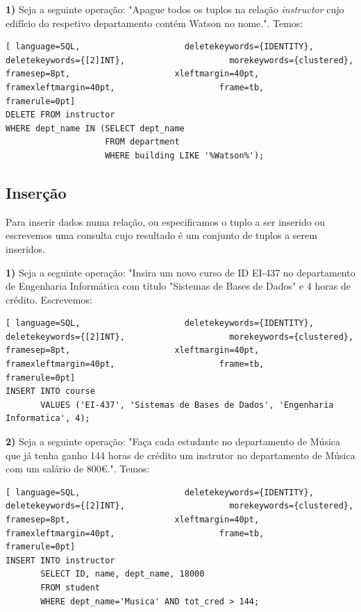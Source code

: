 \documentclass[titlepage]{book}
\theoremstyle{definition}
\begin{document}
\textbf{1)} Seja a seguinte operação: "Apague todos os tuplos na relação \textit{instructor} cujo edifício do respetivo departamento contém Watson no nome.". Temos:
\begin{lstlisting}[ language=SQL,                     deletekeywords={IDENTITY},                     deletekeywords={[2]INT},                     morekeywords={clustered},                     framesep=8pt,                     xleftmargin=40pt,                     framexleftmargin=40pt,                     frame=tb,                     framerule=0pt]
DELETE FROM instructor
WHERE dept_name IN (SELECT dept_name
                    FROM department
                    WHERE building LIKE '%Watson%');
\end{lstlisting}

\subsection{Inserção}
Para inserir dados numa relação, ou especificamos o tuplo a ser inserido ou escrevemos uma consulta cujo resultado é um conjunto de tuplos a serem inseridos.

\textbf{1)} Seja a seguinte operação: "Insira um novo curso de ID EI-437 no departamento de Engenharia Informática com título "Sistemas de Bases de Dados" e 4 horas de crédito. Escrevemos:
\begin{lstlisting}[ language=SQL,                     deletekeywords={IDENTITY},                     deletekeywords={[2]INT},                     morekeywords={clustered},                     framesep=8pt,                     xleftmargin=40pt,                     framexleftmargin=40pt,                     frame=tb,                     framerule=0pt]
INSERT INTO course
       VALUES ('EI-437', 'Sistemas de Bases de Dados', 'Engenharia Informatica', 4);
\end{lstlisting}

\textbf{2)} Seja a seguinte operação: "Faça cada estudante no departamento de Música que já tenha ganho 144 horas de crédito um instrutor no departamento de Música com um salário de 800€.". Temos:
\begin{lstlisting}[ language=SQL,                     deletekeywords={IDENTITY},                     deletekeywords={[2]INT},                     morekeywords={clustered},                     framesep=8pt,                     xleftmargin=40pt,                     framexleftmargin=40pt,                     frame=tb,                     framerule=0pt]
INSERT INTO instructor
       SELECT ID, name, dept_name, 18000
       FROM student
       WHERE dept_name='Musica' AND tot_cred > 144;
\end{lstlisting}
\end{document}
